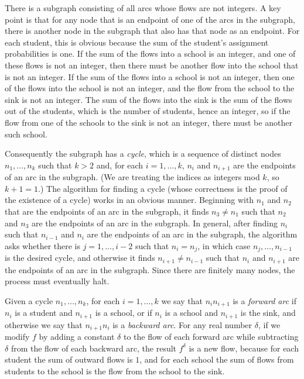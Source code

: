 \documentclass[12pt]{article}
\theoremstyle{definition}
\begin{document}
There is a subgraph consisting of all arcs whose flows are not
integers.  A key point is that for any node that is an endpoint of one
of the arcs in the subgraph, there is another node in the subgraph
that also has that node as an endpoint.  For each student, this is
obvious because the sum of the student's assignment probabilities is
one.  If the sum of the flows into a school is an integer, and one of
these flows is not an integer, then there must be another flow into
the school that is not an integer.  If the sum of the flows into a
school is not an integer, then one of the flows into the school is not
an integer, and the flow from the school to the sink is not an
integer.  The sum of the flows into the sink is the sum of the flows
out of the students, which is the number of students, hence an
integer, so if the flow from one of the schools to the sink is not an
integer, there must be another such school.

Consequently the subgraph has a \emph{cycle}, which is a sequence of
distinct nodes $n_1, \ldots, n_k$ such that $k > 2$ and, for each $i =
1, \ldots, k$, $n_i$ and $n_{i+1}$ are the endpoints of an arc in the
subgraph.  (We are treating the indices as integers mod $k$, so $k + 1
= 1$.)  The algorithm for finding a cycle (whose correctness is the
proof of the existence of a cycle) works in an obvious manner.
Beginning with $n_1$ and $n_2$ that are the endpoints of an arc in the
subgraph, it finds $n_3 \ne n_1$ such that $n_2$ and $n_3$ are the
endpoints of an arc in the subgraph.  In general, after finding $n_i$
such that $n_{i-1}$ and $n_i$ are the endpoints of an arc in the
subgraph, the algorithm asks whether there is $j = 1, \ldots, i-2$
such that $n_i = n_j$, in which case $n_j, \ldots, n_{i-1}$ is the
desired cycle, and otherwise it finds $n_{i+1} \ne n_{i-1}$ such that
$n_i$ and $n_{i+1}$ are the endpoints of an arc in the subgraph.
Since there are finitely many nodes, the process must eventually halt.

Given a cycle $n_1, \ldots, n_k$, for each $i = 1, \ldots, k$ we say
that $n_in_{i+1}$ is a \emph{forward arc} if $n_i$ is a student and
$n_{i+1}$ is a school, or if $n_i$ is a school and $n_{i+1}$ is the
sink, and otherwise we say that $n_{i+1}n_i$ is a \emph{backward arc}.
For any real number $\delta$, if we modify $f$ by adding a constant
$\delta$ to the flow of each forward arc while subtracting $\delta$
from the flow of each backward arc, the result $f^\delta$ is a new
flow, because for each student the sum of outward flows is $1$, and
for each school the sum of flows from students to the school is the
flow from the school to the sink.
\end{document}
